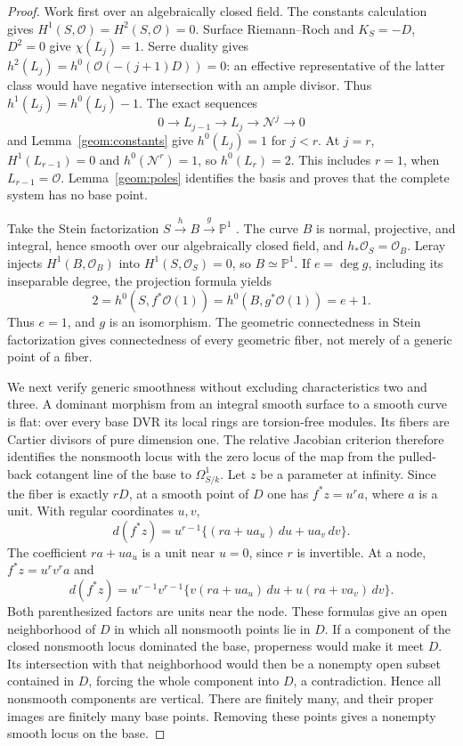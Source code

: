\begin{proof}
Work first over an algebraically closed field.  The constants
calculation gives $H^1(S,\mathcal O)=H^2(S,\mathcal O)=0$.
Surface Riemann--Roch and $K_S=-D$, $D^2=0$ give $\chi(L_j)=1$.
Serre duality gives
$h^2(L_j)=h^0(\mathcal O(-(j+1)D))=0$: an effective representative
of the latter class would have negative intersection with an ample
divisor.  Thus $h^1(L_j)=h^0(L_j)-1$.
The exact sequences
\begin{equation}
0\longrightarrow L_{j-1}\longrightarrow L_j
\longrightarrow\mathcal N^j\longrightarrow0
\label{geom:boundary-sequence}
\end{equation}
and Lemma~\ref{geom:constants} give $h^0(L_j)=1$ for $j<r$.
At $j=r$, $H^1(L_{r-1})=0$ and $h^0(\mathcal N^r)=1$, so
$h^0(L_r)=2$.  This includes $r=1$, when $L_{r-1}=\mathcal O$.
Lemma~\ref{geom:poles} identifies the basis and proves that the
complete system has no base point.

Take the Stein factorization $S\xrightarrow{h}B\xrightarrow{g}\mathbb P^1$
\cite[Tag 03H0]{StacksProject2026}.
The curve $B$ is normal, projective, and integral, hence smooth over
our algebraically closed field, and $h_*\mathcal O_S=\mathcal O_B$.
Leray injects $H^1(B,\mathcal O_B)$ into $H^1(S,\mathcal O_S)=0$,
so $B\simeq\mathbb P^1$.  If $e=\deg g$, including its inseparable
degree, the projection formula yields
\[
2=h^0(S,f^*\mathcal O(1))
 =h^0(B,g^*\mathcal O(1))=e+1.
\]
Thus $e=1$, and $g$ is an isomorphism.  The geometric connectedness
in Stein factorization gives connectedness of every geometric fiber,
not merely of a generic point of a fiber.

We next verify generic smoothness without excluding characteristics
two and three.  A dominant morphism from an integral smooth surface
to a smooth curve is flat: over every base DVR its local rings are
torsion-free modules.  Its fibers are Cartier divisors of pure
dimension one.  The relative Jacobian criterion therefore identifies
the nonsmooth locus with the zero locus of the map from the pulled-back
cotangent line of the base to $\Omega^1_{S/k}$.
Let $z$ be a parameter at infinity.  Since the fiber is exactly
$rD$, at a smooth point of $D$ one has $f^*z=u^ra$, where $a$ is a
unit.  With regular coordinates $u,v$,
\[
d(f^*z)=u^{r-1}\{(ra+ua_u)\,du+ua_v\,dv\}.
\]
The coefficient $ra+ua_u$ is a unit near $u=0$, since $r$ is
invertible.  At a node, $f^*z=u^rv^ra$ and
\[
d(f^*z)=u^{r-1}v^{r-1}
 \{v(ra+ua_u)\,du+u(ra+va_v)\,dv\}.
\]
Both parenthesized factors are units near the node.  These formulas
give an open neighborhood of $D$ in which all nonsmooth points lie
in $D$.  If a component of the closed nonsmooth locus dominated the
base, properness would make it meet $D$.  Its intersection with that
neighborhood would then be a nonempty open subset contained in $D$,
forcing the whole component into $D$, a contradiction.  Hence all
nonsmooth components are vertical.  There are finitely many, and
their proper images are finitely many base points.  Removing these
points gives a nonempty smooth locus on the base.


\end{proof}

